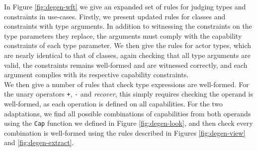 In Figure \ref{fig:degen-wft} we give an expanded set of rules for judging types and constraints in use-cases. Firstly, we present updated rules for classes and constraints with type arguments. In addition to witnessing the constraints on the type parameters they replace, the arguments must comply with the capability constraints of each type parameter. We then give the rules for actor types, which are nearly identical to that of classes, again checking that all type arguments are valid, the constraints remains well-formed and are witnessed correctly, and each argument complies with its respective capability constraints. \\

We then give a number of rules that check type expressions are well-formed. For the unary operators \texttt{+}, \texttt{-} and \textit{recover}, this simply requires checking the operand is well-formed, as each operation is defined on all capabilities. For the two adaptations, we find all possible combinations of capabilities from both operands using the \texttt{Cap} function we defined in Figure \ref{fig:degen-look}, and then check every combination is well-formed using the rules described in Figures \ref{fig:degen-view} and \ref{fig:degen-extract}.

